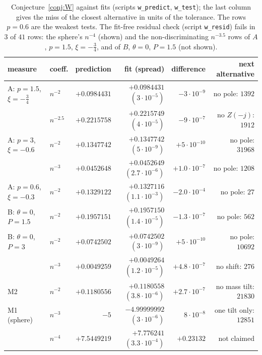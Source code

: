 \begin{table}[ht]
\centering
\footnotesize
\setlength{\tabcolsep}{4pt}
\begin{tabular}{llrrrr}
\toprule
measure & coeff. & prediction & fit (spread) & difference & next alternative\\
\midrule
A: $p=1.5$, $\xi=-\frac34$ & $n^{-2}$ & $+0.0984431$ & $+0.0984431$ $(3\cdot10^{-5})$ & $-3\cdot10^{-9}$ & no pole: $1392$\\
 & $n^{-2.5}$ & $+0.2215758$ & $+0.2215749$ $(4\cdot10^{-5})$ & $-9\cdot10^{-7}$ & no $Z(-j)$: $1912$\\
A: $p=3$, $\xi=-0.6$ & $n^{-2}$ & $+0.1347742$ & $+0.1347742$ $(5\cdot10^{-9})$ & $+5\cdot10^{-10}$ & no pole: $31968$\\
 & $n^{-3}$ & $+0.0452648$ & $+0.0452649$ $(2.7\cdot10^{-6})$ & $+1.0\cdot10^{-7}$ & no pole: $1208$\\
A: $p=0.6$, $\xi=-0.3$ & $n^{-2}$ & $+0.1329122$ & $+0.1327116$ $(1.1\cdot10^{-3})$ & $-2.0\cdot10^{-4}$ & no pole: $27$\\
B: $\theta=0$, $P=1.5$ & $n^{-2}$ & $+0.1957151$ & $+0.1957150$ $(1.4\cdot10^{-5})$ & $-1.3\cdot10^{-7}$ & no pole: $562$\\
B: $\theta=0$, $P=3$ & $n^{-2}$ & $+0.0742502$ & $+0.0742502$ $(3\cdot10^{-9})$ & $+5\cdot10^{-10}$ & no pole: $10692$\\
 & $n^{-3}$ & $+0.0049259$ & $+0.0049264$ $(1.2\cdot10^{-5})$ & $+4.8\cdot10^{-7}$ & no shift: $276$\\
M2 & $n^{-2}$ & $+0.1180556$ & $+0.1180558$ $(3.8\cdot10^{-6})$ & $+2.7\cdot10^{-7}$ & no mass tilt: $21830$\\
M1 (sphere) & $n^{-3}$ & $-5$ & $-4.99999992$ $(3\cdot10^{-6})$ & $8\cdot10^{-8}$ & one tilt only: $12851$\\
 & $n^{-4}$ & $+7.5449219$ & $+7.776241$ $(3.3\cdot10^{-4})$ & $+0.23132$ & not claimed\\
\bottomrule
\end{tabular}
\caption{Conjecture~\ref{conj:W} against fits (scripts \texttt{w\_predict}, \texttt{w\_test}); the last column gives the miss of the closest
alternative in units of the tolerance. The rows $p=0.6$ are the weakest tests. The fit-free residual check (script \texttt{w\_resid}) fails
in $3$ of $41$ rows: the sphere's $n^{-4}$ (shown) and the non-discriminating $n^{-3.5}$ rows of $A$, $p=1.5$, $\xi=-\frac34$, and of $B$,
$\theta=0$, $P=1.5$ (not shown).}
\label{tab:W}
\end{table}


